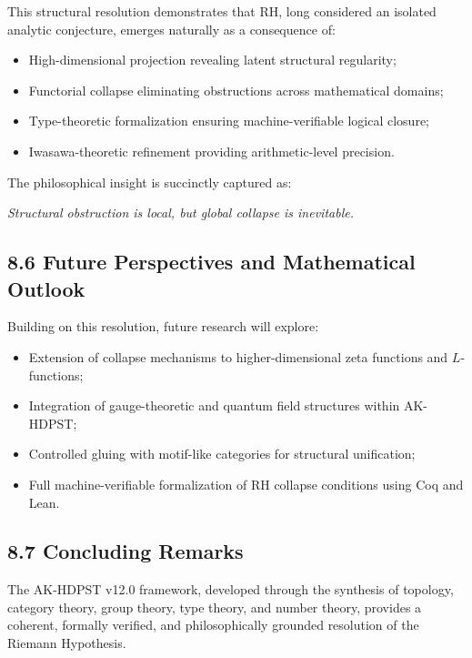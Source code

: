 \documentclass[11pt]{article}
\begin{document}
This structural resolution demonstrates that RH, long considered an isolated analytic conjecture, emerges naturally as a consequence of:

\begin{itemize}
    \item High-dimensional projection revealing latent structural regularity;
    \item Functorial collapse eliminating obstructions across mathematical domains;
    \item Type-theoretic formalization ensuring machine-verifiable logical closure;
    \item Iwasawa-theoretic refinement providing arithmetic-level precision.
\end{itemize}

The philosophical insight is succinctly captured as:

\begin{center}
\textit{Structural obstruction is local, but global collapse is inevitable.}
\end{center}

\subsection*{8.6 Future Perspectives and Mathematical Outlook}

Building on this resolution, future research will explore:

\begin{itemize}
    \item Extension of collapse mechanisms to higher-dimensional zeta functions and $L$-functions;
    \item Integration of gauge-theoretic and quantum field structures within AK-HDPST;
    \item Controlled gluing with motif-like categories for structural unification;
    \item Full machine-verifiable formalization of RH collapse conditions using Coq and Lean.
\end{itemize}

\subsection*{8.7 Concluding Remarks}

The AK-HDPST v12.0 framework, developed through the synthesis of topology, category theory, group theory, type theory, and number theory, provides a coherent, formally verified, and philosophically grounded resolution of the Riemann Hypothesis.
\end{document}
